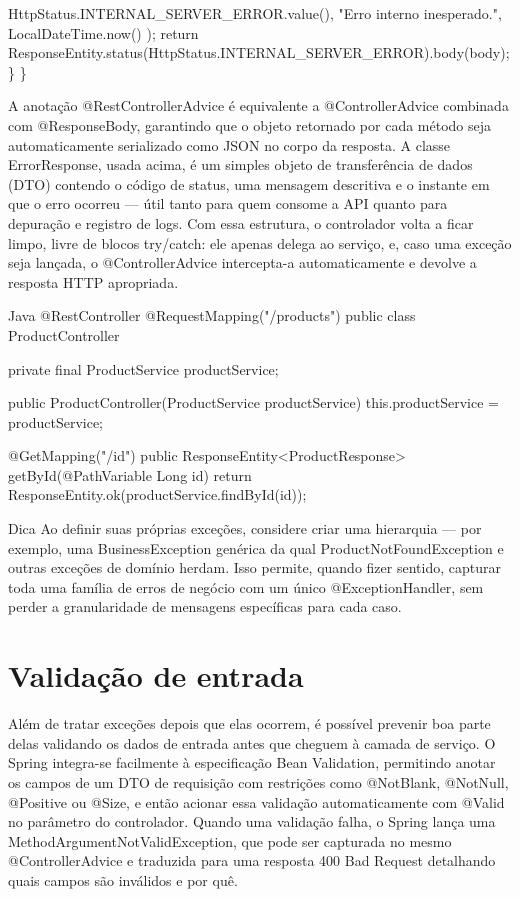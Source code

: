 \begin{infobox}{HttpStatus.INTERNAL\_SERVER\_ERROR.value(),}
"Erro interno inesperado.", LocalDateTime.now() ); return ResponseEntity.status(HttpStatus.INTERNAL\_SERVER\_ERROR).body(body); \} \}
\end{infobox}

A anotação @RestControllerAdvice é equivalente a @ControllerAdvice combinada com @ResponseBody, garantindo que o objeto retornado por cada método seja automaticamente serializado como JSON no corpo da resposta. A classe ErrorResponse, usada acima, é um simples objeto de transferência de dados (DTO) contendo o código de status, uma mensagem descritiva e o instante em que o erro ocorreu — útil tanto para quem consome a API quanto para depuração e registro de logs. Com essa estrutura, o controlador volta a ficar limpo, livre de blocos try/catch: ele apenas delega ao serviço, e, caso uma exceção seja lançada, o @ControllerAdvice intercepta-a automaticamente e devolve a resposta HTTP apropriada.

\begin{codebox}{Java}
@RestController
@RequestMapping("/products")
public class ProductController {

       private final ProductService productService;

       public ProductController(ProductService productService) {
           this.productService = productService;
       }

       @GetMapping("/{id}")
       public ResponseEntity<ProductResponse> getById(@PathVariable Long id) {
           return ResponseEntity.ok(productService.findById(id));
       }
}
\end{codebox}

\begin{infobox}{Dica}
Ao definir suas próprias exceções, considere criar uma hierarquia — por exemplo, uma BusinessException genérica da qual ProductNotFoundException e outras exceções de domínio herdam. Isso permite, quando fizer sentido, capturar toda uma família de erros de negócio com um único @ExceptionHandler, sem perder a granularidade de mensagens específicas para cada caso.
\end{infobox}

\section{Validação de entrada}

Além de tratar exceções depois que elas ocorrem, é possível prevenir boa parte delas validando os dados de entrada antes que cheguem à camada de serviço. O Spring integra-se facilmente à especificação Bean Validation, permitindo anotar os campos de um DTO de requisição com restrições como @NotBlank, @NotNull, @Positive ou @Size, e então acionar essa validação automaticamente com @Valid no parâmetro do controlador. Quando uma validação falha, o Spring lança uma MethodArgumentNotValidException, que pode ser capturada no mesmo @ControllerAdvice e traduzida para uma resposta 400 Bad Request detalhando quais campos são inválidos e por quê.

